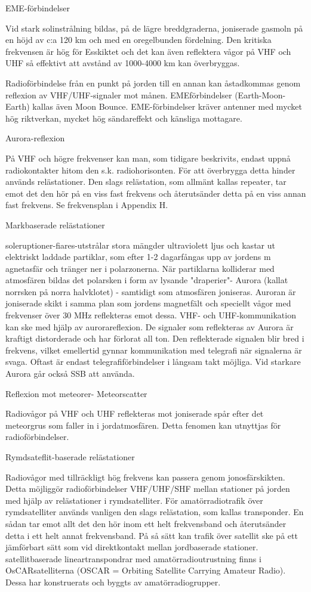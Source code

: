 EME-förbindelser

Vid stark solinstrålning bildas, på de lägre
breddgraderna, joniserade gasmoln på en
höjd av c:a 120 km och med en oregelbunden fördelning.
Den kritiska frekvensen är hög för Esskiktet och det kan även reflektera vågor på
VHF och UHF så effektivt att avstånd av
1000-4000 km kan överbryggas.

Radioförbindelse från en punkt på jorden till
en annan kan åstadkommas genom reflexion av VHF/UHF-signaler mot månen. EMEförbindelser (Earth-Moon-Earth) kallas även
Moon Bounce. EME-förbindelser kräver antenner med mycket hög riktverkan, mycket
hög sändareffekt och känsliga mottagare.

Aurora-reflexion

På VHF och högre frekvenser kan man, som
tidigare beskrivits, endast uppnå radiokontakter hitom den s.k. radiohorisonten.
För att överbrygga detta hinder används
relästationer. Den slags relästation, som allmänt kallas repeater, tar emot det den hör på
en viss fast frekvens och återutsänder detta
på en viss annan fast frekvens. Se frekvensplan i Appendix H.

Markbaserade relästationer

soleruptioner-fiares-utstrålar stora mängder ultraviolett ljus och kastar ut elektriskt
laddade partiklar, som efter 1-2 dagarfångas
upp av jordens m agnetasfär och tränger ner
i polarzonerna. När partiklarna kolliderar med
atmosfären bildas det polarsken i form av
lysande "draperier"- Aurora (kallat norrsken
på norra halvklotet) - samtidigt som atmosfären joniseras. Auroran är joniserade skikt
i samma plan som jordens magnetfält och
speciellt vågor med frekvenser över 30 MHz
reflekteras emot dessa.
VHF- och UHF-kommunikation kan ske
med hjälp av aurorareflexion. De signaler
som reflekteras av Aurora är kraftigt distorderade och har förlorat all ton. Den reflekterade signalen blir bred i frekvens, vilket emellertid gynnar kommunikation med telegrafi
när signalerna är svaga. Oftast är endast
telegrafiförbindelser i långsam takt möjliga.
Vid starkare Aurora går också SSB att använda.

Reflexion mot meteorer- Meteorscatter

Radiovågor på VHF och UHF reflekteras
mot joniserade spår efter det meteorgrus
som faller in i jordatmosfären. Detta fenomen kan utnyttjas för radioförbindelser.

Rymdsateflit-baserade relästationer

Radiovågor med tillräckligt hög frekvens kan
passera genom jonosfärskikten. Detta möjliggör radioförbindelser
VHF/UHF/SHF
mellan stationer på jorden med hjälp av relästationer i rymdsatelliter.
För amatörradiotrafik över rymdsatelliter
används vanligen den slags relästation, som
kallas transponder. En sådan tar emot allt
det den hör inom ett helt frekvensband och
återutsänder detta i ett helt annat frekvensband. På så sätt kan trafik över satellit ske på
ett jämförbart sätt som vid direktkontakt mellan jordbaserade stationer.
satellitbaserade lineartranspondrar med
amatörradioutrustning finns i OsCARsatelliterna (OSCAR = Orbiting Satellite
Carrying Amateur Radio). Dessa har konstruerats och byggts av amatörradiogrupper.

